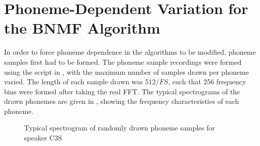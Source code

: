\section{Phoneme-Dependent Variation for the \acl{BNMF} Algorithm}

In order to force phoneme dependence in the algorithms to be modified,
phoneme samples first had to be formed. The phoneme sample recordings
were formed using the script in , with the
maximum number of samples drawn per phoneme varied. The length of
each sample drawn was $512/FS$, such that 256 frequency bins were
formed after taking the real \ac{FFT}. The typical spectrograms of
the drawn phonemes are given in ,
showing the frequency characteristics of each phoneme.

\begin{figure}[h]




\protect\caption{\label{fig:drawn-phoneme-spectrogram}Typical spectrogram of randomly
drawn phoneme samples for speaker C3S}
\end{figure}



